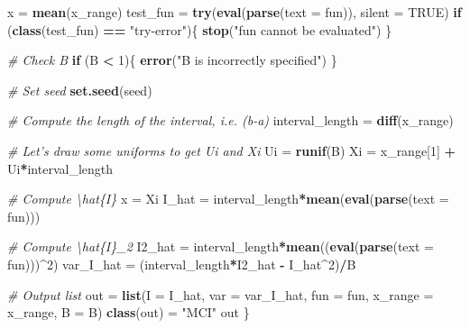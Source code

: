 \documentclass[12pt,]{krantz}
\newenvironment{Shaded}{\begin{snugshade}}{\end{snugshade}}
\newcommand{\KeywordTok}[1]{\textcolor[rgb]{0.27,0.27,0.27}{\textbf{#1}}}
\newcommand{\DataTypeTok}[1]{\textcolor[rgb]{0.27,0.27,0.27}{#1}}
\newcommand{\DecValTok}[1]{\textcolor[rgb]{0.06,0.06,0.06}{#1}}
\newcommand{\StringTok}[1]{\textcolor[rgb]{0.5,0.5,0.5}{#1}}
\newcommand{\CommentTok}[1]{\textcolor[rgb]{0.37,0.37,0.37}{\textit{#1}}}
\newcommand{\OtherTok}[1]{\textcolor[rgb]{0.37,0.37,0.37}{#1}}
\newcommand{\ControlFlowTok}[1]{\textcolor[rgb]{0.27,0.27,0.27}{\textbf{#1}}}
\newcommand{\OperatorTok}[1]{\textcolor[rgb]{0.43,0.43,0.43}{\textbf{#1}}}
\newcommand{\NormalTok}[1]{#1}
\begin{document}
\begin{Shaded}
\begin{Highlighting}[]
\NormalTok{  x =}\StringTok{ }\KeywordTok{mean}\NormalTok{(x_range)}
\NormalTok{  test_fun =}\StringTok{ }\KeywordTok{try}\NormalTok{(}\KeywordTok{eval}\NormalTok{(}\KeywordTok{parse}\NormalTok{(}\DataTypeTok{text =}\NormalTok{ fun)), }\DataTypeTok{silent =} \OtherTok{TRUE}\NormalTok{)}
  \ControlFlowTok{if}\NormalTok{ (}\KeywordTok{class}\NormalTok{(test_fun) }\OperatorTok{==}\StringTok{ "try-error"}\NormalTok{)\{}
    \KeywordTok{stop}\NormalTok{(}\StringTok{"fun cannot be evaluated"}\NormalTok{)}
\NormalTok{  \}}

  \CommentTok{# Check B}
  \ControlFlowTok{if}\NormalTok{ (B }\OperatorTok{<}\StringTok{ }\DecValTok{1}\NormalTok{)\{}
    \KeywordTok{error}\NormalTok{(}\StringTok{"B is incorrectly specified"}\NormalTok{)}
\NormalTok{  \}}

  \CommentTok{# Set seed}
  \KeywordTok{set.seed}\NormalTok{(seed)}

  \CommentTok{# Compute the length of the interval, i.e. (b-a)}
\NormalTok{  interval_length =}\StringTok{ }\KeywordTok{diff}\NormalTok{(x_range)}

  \CommentTok{# Let's draw some uniforms to get Ui and Xi}
\NormalTok{  Ui =}\StringTok{ }\KeywordTok{runif}\NormalTok{(B)}
\NormalTok{  Xi =}\StringTok{ }\NormalTok{x_range[}\DecValTok{1}\NormalTok{] }\OperatorTok{+}\StringTok{ }\NormalTok{Ui}\OperatorTok{*}\NormalTok{interval_length}

  \CommentTok{# Compute \textbackslash{}hat\{I\}}
\NormalTok{  x =}\StringTok{ }\NormalTok{Xi}
\NormalTok{  I_hat =}\StringTok{ }\NormalTok{interval_length}\OperatorTok{*}\KeywordTok{mean}\NormalTok{(}\KeywordTok{eval}\NormalTok{(}\KeywordTok{parse}\NormalTok{(}\DataTypeTok{text =}\NormalTok{ fun)))}

  \CommentTok{# Compute \textbackslash{}hat\{I\}_2}
\NormalTok{  I2_hat =}\StringTok{ }\NormalTok{interval_length}\OperatorTok{*}\KeywordTok{mean}\NormalTok{((}\KeywordTok{eval}\NormalTok{(}\KeywordTok{parse}\NormalTok{(}\DataTypeTok{text =}\NormalTok{ fun)))}\OperatorTok{^}\DecValTok{2}\NormalTok{)}
\NormalTok{  var_I_hat =}\StringTok{ }\NormalTok{(interval_length}\OperatorTok{*}\NormalTok{I2_hat }\OperatorTok{-}\StringTok{ }\NormalTok{I_hat}\OperatorTok{^}\DecValTok{2}\NormalTok{)}\OperatorTok{/}\NormalTok{B}

  \CommentTok{# Output list}
\NormalTok{  out =}\StringTok{ }\KeywordTok{list}\NormalTok{(}\DataTypeTok{I =}\NormalTok{ I_hat, }\DataTypeTok{var =}\NormalTok{ var_I_hat,}
             \DataTypeTok{fun =}\NormalTok{ fun, }\DataTypeTok{x_range =}\NormalTok{ x_range, }\DataTypeTok{B =}\NormalTok{ B)}
  \KeywordTok{class}\NormalTok{(out) =}\StringTok{ "MCI"}
\NormalTok{  out}
\NormalTok{\}}
\end{Highlighting}
\end{Shaded}
\end{document}
